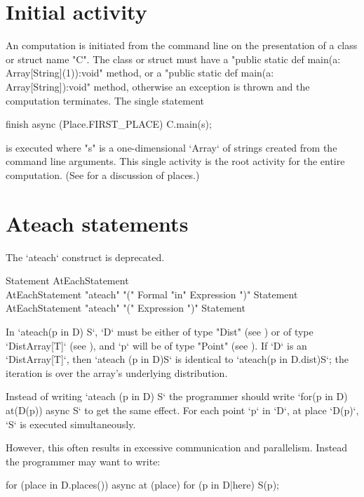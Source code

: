 \section{Initial activity}\label{initial-computation}

An \Xten{} computation is initiated from the command line on the
presentation of a class or struct name \xcd"C". The class or struct must have a
\xcd"public static def main(a: Array[String](1)):void" method, 
or a \xcd"public static def main(a: Array[String]):void" method, 
otherwise an exception is thrown
and the computation terminates.  The single statement
\begin{xten}
finish async (Place.FIRST_PLACE) {
  C.main(s);
}
\end{xten} 
\noindent is executed where \xcd"s" is a one-dimensional \xcd`Array` of
strings created 
from the command line arguments. This single activity is the root activity
for the entire computation. (See  for a discussion of
places.)


\section{Ateach statements}\label{ateach-section}
\deprecated{} The \xcd`ateach` construct is deprecated.
\begin{grammar}
Statement \: AtEachStatement \\
AtEachStatement \:
      \xcd"ateach" \xcd"(" Formal \xcd"in" Expression \xcd")"
         Statement \\
AtEachStatement \:
      \xcd"ateach" \xcd"(" Expression \xcd")"
         Statement 
\end{grammar}
In \xcd`ateach(p in D) S`, \xcd`D` must be either of type \xcd"Dist"
(see ) or of type \xcd`DistArray[T]` (see
), and \xcd`p` will be of type \xcd"Point" (see
). If \xcd`D` is an \xcd`DistArray[T]`, then
\xcd`ateach (p in D)S` is identical to 
\xcd`ateach(p in D.dist)S`; the iteration is over the array's underlying
distribution.   

Instead of writing \xcd`ateach (p in D) S` the programmer should write 
\xcd`for(p in D) at(D(p)) async S` to get the same effect. 
For each point \xcd`p` in \xcd`D`, at place \xcd`D(p)`, \xcd`S` is
executed simultaneously.

However, this often results in excessive communication and parallelism. Instead the
programmer may want to write: 
\begin{xten}
for (place in D.places()) async at (place) {
    for (p in D|here) {
        S(p);
    }
}
\end{xten}

